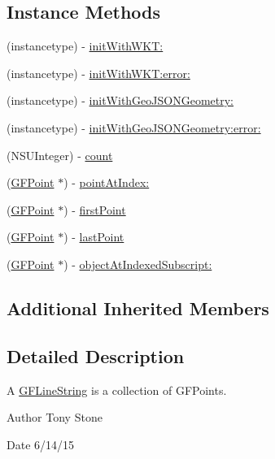 \subsection*{Instance Methods}
\begin{DoxyCompactItemize}
\item 
(instancetype) -\/ \hyperlink{interface_g_f_line_string_a261a4d08fe5cb35f935d265c3a97f453}{init\+With\+W\+K\+T\+:}
\item 
(instancetype) -\/ \hyperlink{interface_g_f_line_string_ad4f0785562bf698de516d1dc30c01d7a}{init\+With\+W\+K\+T\+:error\+:}
\item 
(instancetype) -\/ \hyperlink{interface_g_f_line_string_ad7a913bc12b6099982229190d1debd71}{init\+With\+Geo\+J\+S\+O\+N\+Geometry\+:}
\item 
(instancetype) -\/ \hyperlink{interface_g_f_line_string_affe0307951a95edbf4b35092fc1b92ed}{init\+With\+Geo\+J\+S\+O\+N\+Geometry\+:error\+:}
\item 
(N\+S\+U\+Integer) -\/ \hyperlink{interface_g_f_line_string_a58fc2980cff73581d57943a64d60ddba}{count}
\item 
(\hyperlink{interface_g_f_point}{G\+F\+Point} $\ast$) -\/ \hyperlink{interface_g_f_line_string_a51963123a916fd666131859f571e2609}{point\+At\+Index\+:}
\item 
(\hyperlink{interface_g_f_point}{G\+F\+Point} $\ast$) -\/ \hyperlink{interface_g_f_line_string_a1fc7f9d3388d5237cb824573e8f6f71f}{first\+Point}
\item 
(\hyperlink{interface_g_f_point}{G\+F\+Point} $\ast$) -\/ \hyperlink{interface_g_f_line_string_aa9db281010dcfe2ab30b697710859dde}{last\+Point}
\item 
(\hyperlink{interface_g_f_point}{G\+F\+Point} $\ast$) -\/ \hyperlink{interface_g_f_line_string_a0711dbf3ae2b60f3f4d447578f544323}{object\+At\+Indexed\+Subscript\+:}
\end{DoxyCompactItemize}
\subsection*{Additional Inherited Members}


\subsection{Detailed Description}
A \hyperlink{interface_g_f_line_string}{G\+F\+Line\+String} is a collection of G\+F\+Points. 

\begin{DoxyAuthor}{Author}
Tony Stone 
\end{DoxyAuthor}
\begin{DoxyDate}{Date}
6/14/15 
\end{DoxyDate}


